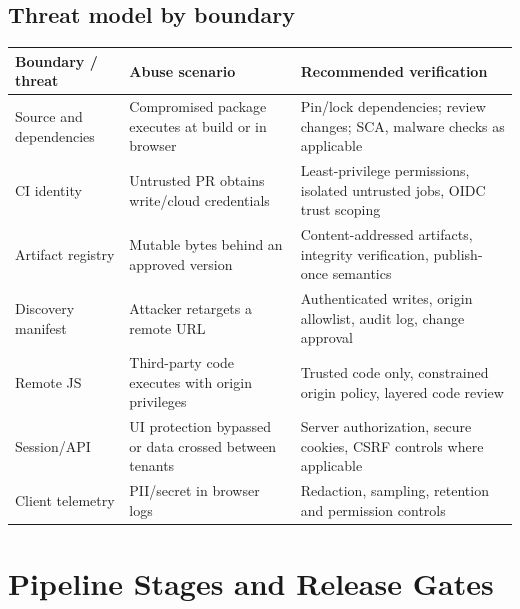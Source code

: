 \documentclass[11pt,letterpaper,oneside]{report}
\begin{document}
\section{Threat model by boundary}
\begin{longtable}{>{\raggedright\arraybackslash}p{.24\linewidth}>{\raggedright\arraybackslash}p{.34\linewidth}>{\raggedright\arraybackslash}p{.32\linewidth}}\toprule Boundary / threat & Abuse scenario & Recommended verification \\\midrule
Source and dependencies & Compromised package executes at build or in browser & Pin/lock dependencies; review changes; SCA, malware checks as applicable\\
CI identity & Untrusted PR obtains write/cloud credentials & Least-privilege permissions, isolated untrusted jobs, OIDC trust scoping\\
Artifact registry & Mutable bytes behind an approved version & Content-addressed artifacts, integrity verification, publish-once semantics\\
Discovery manifest & Attacker retargets a remote URL & Authenticated writes, origin allowlist, audit log, change approval\\
Remote JS & Third-party code executes with origin privileges & Trusted code only, constrained origin policy, layered code review\\
Session/API & UI protection bypassed or data crossed between tenants & Server authorization, secure cookies, CSRF controls where applicable\\
Client telemetry & PII/secret in browser logs & Redaction, sampling, retention and permission controls\\\bottomrule\end{longtable}
\chapter{Pipeline Stages and Release Gates}
\begin{center}\small{}\end{center}
\end{document}
